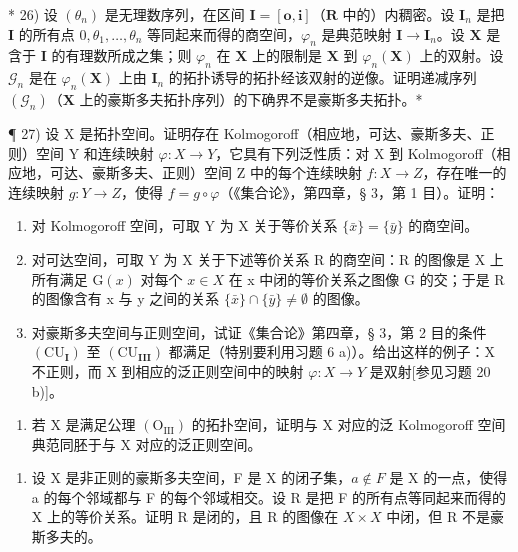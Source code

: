 * 26) 设 \((\theta_{n})\) 是无理数序列，在区间 \(\mathbf{I} = [\mathbf{o},\mathbf{i}]\)（\(\mathbf{R}\) 中的）内稠密。设 \(\mathbf{I}_n\) 是把 \(\mathbf{I}\) 的所有点 \(0, \theta_1, \ldots, \theta_n\) 等同起来而得的商空间，\(\varphi_n\) 是典范映射 \(\mathbf{I} \to \mathbf{I}_n\)。设 \(\mathbf{X}\) 是含于 \(\mathbf{I}\) 的有理数所成之集；则 \(\varphi_n\) 在 \(\mathbf{X}\) 上的限制是 \(\mathbf{X}\) 到 \(\varphi_n(\mathbf{X})\) 上的双射。设 \(\mathcal{G}_n\) 是在 \(\varphi_n(\mathbf{X})\) 上由 \(\mathbf{I}_n\) 的拓扑诱导的拓扑经该双射的逆像。证明递减序列 \((\mathcal{G}_n)\)（\(\mathbf{X}\) 上的豪斯多夫拓扑序列）的下确界不是豪斯多夫拓扑。*

¶ 27) 设 X 是拓扑空间。证明存在 Kolmogoroff（相应地，可达、豪斯多夫、正则）空间 Y 和连续映射 \(\varphi: X \to Y\)，它具有下列泛性质：对 X 到 Kolmogoroff（相应地，可达、豪斯多夫、正则）空间 Z 中的每个连续映射 \(f: X \to Z\)，存在唯一的连续映射 \(g: Y \to Z\)，使得 \(f = g \circ \varphi\)（《集合论》，第四章，§ 3，第 1 目）。证明：

\begin{enumerate}
\def\labelenumi{\alph{enumi})}
\item
  对 Kolmogoroff 空间，可取 Y 为 X 关于等价关系 \(\{\bar{x}\}=\{\bar{y}\}\) 的商空间。
\item
  对可达空间，可取 Y 为 X 关于下述等价关系 R 的商空间：R 的图像是 X 上所有满足 \(\mathrm{G}(x)\) 对每个 \(x \in X\) 在 x 中闭的等价关系之图像 G 的交；于是 R 的图像含有 x 与 y 之间的关系 \(\{\bar{x}\} \cap \{\bar{y}\} \neq \emptyset\) 的图像。
\item
  对豪斯多夫空间与正则空间，试证《集合论》第四章，§ 3，第 2 目的条件 \((\mathrm{CU}_{\mathbf{I}})\) 至 \((\mathrm{CU}_{\mathbf{III}})\) 都满足（特别要利用习题 6 a)）。给出这样的例子：X 不正则，而 X 到相应的泛正则空间中的映射 \(\varphi: X \to Y\) 是双射{[}参见习题 20 b){]}。
\end{enumerate}

\begin{enumerate}
\def\labelenumi{\alph{enumi})}
\setcounter{enumi}{3}
\tightlist
\item
  若 X 是满足公理 \((\mathrm{O}_{\mathrm{III}})\) 的拓扑空间，证明与 X 对应的泛 Kolmogoroff 空间典范同胚于与 X 对应的泛正则空间。
\end{enumerate}

\begin{enumerate}
\def\labelenumi{\arabic{enumi})}
\setcounter{enumi}{27}
\tightlist
\item
  设 X 是非正则的豪斯多夫空间，F 是 X 的闭子集，\(a \notin F\) 是 X 的一点，使得 a 的每个邻域都与 F 的每个邻域相交。设 R 是把 F 的所有点等同起来而得的 X 上的等价关系。证明 R 是闭的，且 R 的图像在 \(X \times X\) 中闭，但 R 不是豪斯多夫的。
\end{enumerate}

